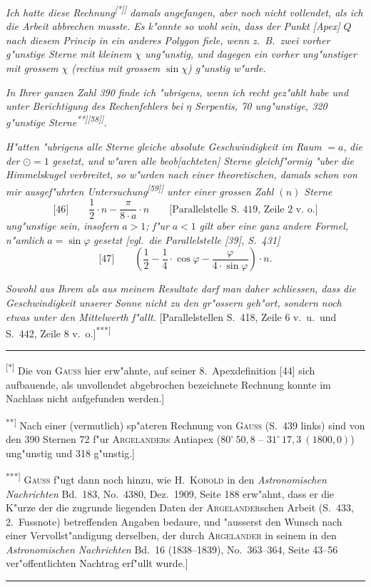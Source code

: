 \documentclass[12pt,a4paper]{article}
\theoremstyle{plain}
\theoremstyle{definition}
\theoremstyle{remark}
\begin{document}
\newpage
\noindent
{\itshape Ich hatte diese Rechnung\textsuperscript{[*]]} damals angefangen, aber noch nicht vollendet, als ich die Arbeit abbrechen musste. Es k"onnte so wohl sein, dass der Punkt [Apex] $Q$ nach diesem Princip in ein anderes Polygon fiele, wenn z.\ B.\ zwei vorher g"unstige Sterne mit kleinem $\chi$ ung"unstig, und dagegen ein vorher ung"unstiger mit grossem $\chi$ (rectius mit grossem $\sin\chi$) g"unstig w"urde.}

{\itshape In Ihrer ganzen Zahl 390 finde ich "ubrigens, wenn ich recht gez"ahlt habe und unter Berichtigung des Rechenfehlers bei $\eta$ Serpentis, 70 ung"unstige, 320 g"unstige Sterne\textsuperscript{**]}\textsuperscript{[58]]}.}

{\itshape H"atten "ubrigens alle Sterne gleiche absolute Geschwindigkeit im Raum} $= a$, {\itshape die der} $\odot = 1$ {\itshape gesetzt, und w"aren alle beob[achteten] Sterne gleichf"ormig "uber die Himmelskugel verbreitet, so w"urden nach einer theoretischen, damals schon von mir ausgef"uhrten Untersuchung\textsuperscript{[59]]} unter einer grossen Zahl $(n)$ Sterne}
\[
\text{[46]}\qquad \frac{1}{2}\cdot n - \frac{\pi}{8\cdot a}\cdot n
\qquad\text{[Parallelstelle S.\ 419, Zeile 2 v.\ o.]}
\]
{\itshape ung"unstige sein, insofern} $a > 1${\itshape ; f"ur} $a < 1$ {\itshape gilt aber eine ganz andere Formel, n"amlich} $a = \sin\varphi$ {\itshape gesetzt [vgl.\ die Parallelstelle [39], S.\ 431]}
\[
\text{[47]}\qquad \left(\frac{1}{2} - \frac{1}{4}\cdot\cos\varphi - \frac{\varphi}{4\cdot\sin\varphi}\right)\cdot n.
\]

{\itshape Sowohl aus Ihrem als aus meinem Resultate darf man daher schliessen, dass die Geschwindigkeit unserer Sonne nicht zu den gr"ossern geh"ort, sondern noch etwas unter den Mittelwerth f"allt.} [Parallelstellen S.\ 418, Zeile 6 v.\ u.\ und S.\ 442, Zeile 8 v.\ o.]\textsuperscript{***]}

\rule{\textwidth}{0.4pt}
{\small
\textsuperscript{[*]} Die von \textsc{Gauss} hier erw"ahnte, auf seiner 8.\ Apexdefinition [44] sich aufbauende, als unvollendet abgebrochen bezeichnete Rechnung konnte im Nachlass nicht aufgefunden werden.]

\textsuperscript{**]} Nach einer (vermutlich) sp"ateren Rechnung von \textsc{Gauss} (S.\ 439 links) sind von den 390 Sternen 72 f"ur \textsc{Argelander}s Antiapex ($80^{\circ}\,50{,}8$ -- $31^{\circ}\,17{,}3\ (1800{,}0)$) ung"unstig und 318 g"unstig.]

\textsuperscript{***]} \textsc{Gauss} f"ugt dann noch hinzu, wie H.\ \textsc{Kobold} in den {\itshape Astronomischen Nachrichten} Bd.\ 183, No.\ 4380, Dez.\ 1909, Seite 188 erw"ahnt, dass er die K"urze der die zugrunde liegenden Daten der \textsc{Argelander}schen Arbeit (S.\ 433, 2.\ Fussnote) betreffenden Angaben bedaure, und "ausserst den Wunsch nach einer Vervollst"andigung derselben, der durch \textsc{Argelander} in seinem in den {\itshape Astronomischen Nachrichten} Bd.\ 16 (1838--1839), No.\ 363--364, Seite 43--56 ver"offentlichten Nachtrag erf"ullt wurde.]
}
\rule{\textwidth}{0.4pt}
\end{document}
